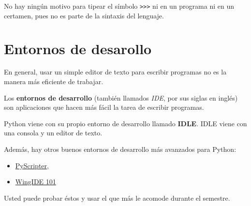 No hay ningún motivo para tipear el símbolo \lstinline!>>>! ni en un
programa ni en un certamen, pues no es parte de la sintaxis del
lenguaje.

\section{Entornos de desarollo}

En general, usar un simple editor de texto para escribir programas no es
la manera más eficiente de trabajar.

Los \textbf{entornos de desarrollo} (también llamados \emph{IDE}, por
sus siglas en inglés) son aplicaciones que hacen más fácil la tarea de
escribir programas.

Python viene con su propio entorno de desarrollo llamado \textbf{IDLE}.
IDLE viene con una consola y un editor de texto.

Además, hay otros buenos entornos de desarrollo más avanzados para
Python:

\begin{itemize}
\item
  \href{http://code.google.com/p/pyscripter/downloads/list}{PyScripter},
\item
  \href{http://www.wingware.com/downloads/wingide-101/3.2.12-1/binaries}{WingIDE
  101}
\end{itemize}

Usted puede probar éstos y usar el que más le acomode durante el
semestre.

